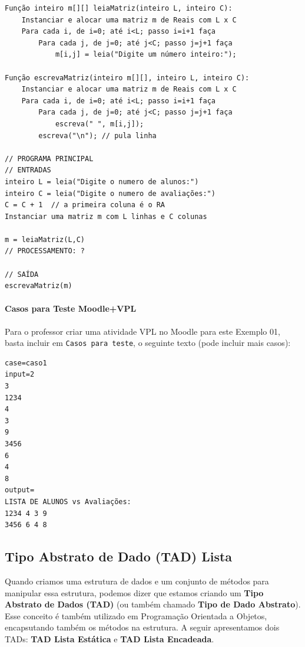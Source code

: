 \documentclass[12pt,a4paper]{article}
\begin{document}
    \begin{verbatim}
Função inteiro m[][] leiaMatriz(inteiro L, inteiro C):
    Instanciar e alocar uma matriz m de Reais com L x C
    Para cada i, de i=0; até i<L; passo i=i+1 faça
        Para cada j, de j=0; até j<C; passo j=j+1 faça
            m[i,j] = leia("Digite um número inteiro:");

Função escrevaMatriz(inteiro m[][], inteiro L, inteiro C):
    Instanciar e alocar uma matriz m de Reais com L x C
    Para cada i, de i=0; até i<L; passo i=i+1 faça
        Para cada j, de j=0; até j<C; passo j=j+1 faça
            escreva(" ", m[i,j]);
        escreva("\n"); // pula linha

// PROGRAMA PRINCIPAL
// ENTRADAS
inteiro L = leia("Digite o numero de alunos:")
inteiro C = leia("Digite o numero de avaliações:")
C = C + 1  // a primeira coluna é o RA
Instanciar uma matriz m com L linhas e C colunas

m = leiaMatriz(L,C)
// PROCESSAMENTO: ?

// SAÍDA
escrevaMatriz(m)
\end{verbatim}

    \hypertarget{casos-para-teste-moodlevpl}{%
\paragraph{Casos para Teste
Moodle+VPL}\label{casos-para-teste-moodlevpl}}

Para o professor criar uma atividade VPL no Moodle para este Exemplo 01,
basta incluir em \texttt{Casos\ para\ teste}, o seguinte texto (pode
incluir mais casos):

\begin{verbatim}
case=caso1
input=2
3
1234
4
3
9
3456
6
4
8
output=
LISTA DE ALUNOS vs Avaliações:
1234 4 3 9
3456 6 4 8
\end{verbatim}

    \hypertarget{tipo-abstrato-de-dado-tad-lista}{%
\subsection{Tipo Abstrato de Dado (TAD)
Lista}\label{tipo-abstrato-de-dado-tad-lista}}

    Quando criamos uma estrutura de dados e um conjunto de métodos para
manipular essa estrutura, podemos dizer que estamos criando um
\textbf{Tipo Abstrato de Dados (TAD)} (ou também chamado \textbf{Tipo de
Dado Abstrato}). Esse conceito é também utilizado em Programação
Orientada a Objetos, encapsutando também os métodos na estrutura. A
seguir apresentamos dois TADs: \textbf{TAD Lista Estática} e \textbf{TAD
Lista Encadeada}.
\end{document}
